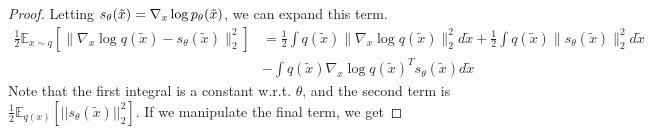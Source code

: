     \begin{proof}
      Letting $s_\theta (\Tilde{x}) = \nabla_x \log p_\theta (\Tilde{x})$, we can expand this term. 
      \begin{align}
        \frac{1}{2} \mathbb{E}_{x\sim q}\left[\|\nabla_x \log q(\tilde{x}) - s_\theta(\tilde{x})\|_2^2\right] & = \frac{1}{2}\int q(\tilde{x})\|\nabla_x \log q(\tilde{x})\|_2^2 d\tilde{x} + \frac{1}{2}\int q(\tilde{x})\|s_\theta(\tilde{x})\|_2^2 d\tilde{x} \\ 
                                                                                                     & - \int q(\tilde{x})\nabla_x \log q(\tilde{x})^T s_\theta(\tilde{x}) d\tilde{x}
      \end{align}
      Note that the first integral is a constant w.r.t. $\theta$, and the second term is $\frac{1}{2} \mathbb{E}_{q(x)} [||s_\theta (\tilde{x})||_2^2]$. If we manipulate the final term, we get 


\end{proof}
